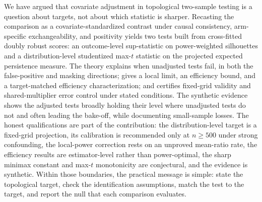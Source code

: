 We have argued that covariate adjustment in topological two-sample testing is a question about targets, not about which statistic is sharper. Recasting the comparison as a covariate-standardized contrast under causal consistency, arm-specific exchangeability, and positivity yields two tests built from cross-fitted doubly robust scores: an outcome-level sup-statistic on power-weighted silhouettes and a distribution-level studentized max-$t$ statistic on the projected expected persistence measure. The theory explains when unadjusted tests fail, in both the false-positive and masking directions; gives a local limit, an efficiency bound, and a target-matched efficiency characterization; and certifies fixed-grid validity and shared-multiplier error control under stated conditions. The synthetic evidence shows the adjusted tests broadly holding their level where unadjusted tests do not and often leading the bake-off, while documenting small-sample losses. The honest qualifications are part of the contribution: the distribution-level target is a fixed-grid projection, its calibration is recommended only at $n \ge 500$ under strong confounding, the local-power correction rests on an unproved mean-ratio rate, the efficiency results are estimator-level rather than power-optimal, the sharp minimax constant and max-$t$ monotonicity are conjectural, and the evidence is synthetic. Within those boundaries, the practical message is simple: state the topological target, check the identification assumptions, match the test to the target, and report the null that each comparison evaluates.
